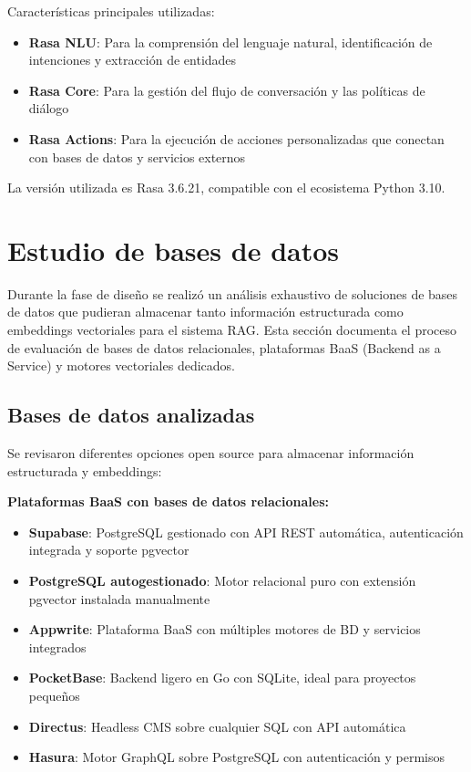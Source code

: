 Características principales utilizadas:
\begin{itemize}
    \item \textbf{Rasa NLU}: Para la comprensión del lenguaje natural, identificación de intenciones y extracción de entidades
    \item \textbf{Rasa Core}: Para la gestión del flujo de conversación y las políticas de diálogo
    \item \textbf{Rasa Actions}: Para la ejecución de acciones personalizadas que conectan con bases de datos y servicios externos
\end{itemize}

La versión utilizada es Rasa 3.6.21, compatible con el ecosistema Python 3.10.

\section{Estudio de bases de datos}\label{sec:estudio-bases-datos}

Durante la fase de diseño se realizó un análisis exhaustivo de soluciones de bases de datos que pudieran almacenar tanto información estructurada como embeddings vectoriales para el sistema RAG. Esta sección documenta el proceso de evaluación de bases de datos relacionales, plataformas BaaS (Backend as a Service) y motores vectoriales dedicados.

\subsection{Bases de datos analizadas}\label{subsec:bases-datos-analizadas}

Se revisaron diferentes opciones open source para almacenar información estructurada y embeddings:

\textbf{Plataformas BaaS con bases de datos relacionales:}
\begin{itemize}
    \item \textbf{Supabase}: PostgreSQL gestionado con API REST automática, autenticación integrada y soporte pgvector
    \item \textbf{PostgreSQL autogestionado}: Motor relacional puro con extensión pgvector instalada manualmente
    \item \textbf{Appwrite}: Plataforma BaaS con múltiples motores de BD y servicios integrados
    \item \textbf{PocketBase}: Backend ligero en Go con SQLite, ideal para proyectos pequeños
    \item \textbf{Directus}: Headless CMS sobre cualquier SQL con API automática
    \item \textbf{Hasura}: Motor GraphQL sobre PostgreSQL con autenticación y permisos
\end{itemize}

